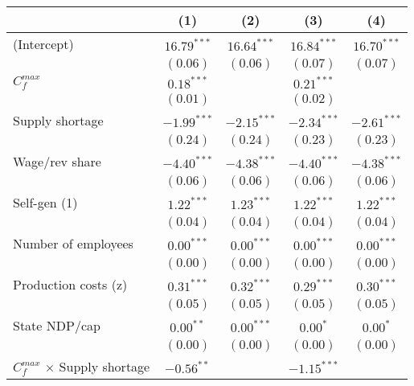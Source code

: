 
\begin{tabular}{l c c c c }
\toprule
 & (1) & (2) & (3) & (4) \\
\midrule
(Intercept)                            & $16.79^{***}$ & $16.64^{***}$ & $16.84^{***}$ & $16.70^{***}$ \\
                                       & $(0.06)$      & $(0.06)$      & $(0.07)$      & $(0.07)$      \\
$C^{max}_{f}$                          & $0.18^{***}$  &               & $0.21^{***}$  &               \\
                                       & $(0.01)$      &               & $(0.02)$      &               \\
Supply shortage                        & $-1.99^{***}$ & $-2.15^{***}$ & $-2.34^{***}$ & $-2.61^{***}$ \\
                                       & $(0.24)$      & $(0.24)$      & $(0.23)$      & $(0.23)$      \\
Wage/rev share                         & $-4.40^{***}$ & $-4.38^{***}$ & $-4.40^{***}$ & $-4.38^{***}$ \\
                                       & $(0.06)$      & $(0.06)$      & $(0.06)$      & $(0.06)$      \\
Self-gen (1)                           & $1.22^{***}$  & $1.23^{***}$  & $1.22^{***}$  & $1.22^{***}$  \\
                                       & $(0.04)$      & $(0.04)$      & $(0.04)$      & $(0.04)$      \\
Number of employees                    & $0.00^{***}$  & $0.00^{***}$  & $0.00^{***}$  & $0.00^{***}$  \\
                                       & $(0.00)$      & $(0.00)$      & $(0.00)$      & $(0.00)$      \\
Production costs (z)                   & $0.31^{***}$  & $0.32^{***}$  & $0.29^{***}$  & $0.30^{***}$  \\
                                       & $(0.05)$      & $(0.05)$      & $(0.05)$      & $(0.05)$      \\
State NDP/cap                          & $0.00^{**}$   & $0.00^{***}$  & $0.00^{*}$    & $0.00^{*}$    \\
                                       & $(0.00)$      & $(0.00)$      & $(0.00)$      & $(0.00)$      \\
$C^{max}_{f}$ $\times$ Supply shortage & $-0.56^{**}$  &               & $-1.15^{***}$ &               \\

\end{tabular}
